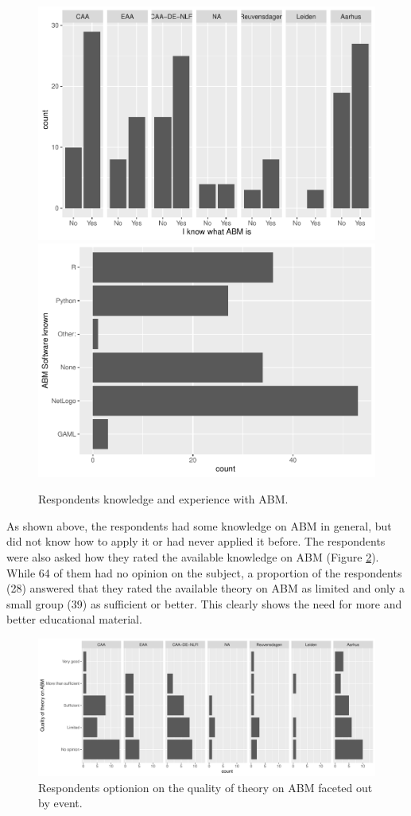 \documentclass[
]{article}
\begin{document}
\begin{figure}
\includegraphics[width=0.5\linewidth]{paper_files/figure-latex/abm-knowledge-1} \includegraphics[width=0.5\linewidth]{paper_files/figure-latex/abm-knowledge-2} \caption{Respondents knowledge and experience with ABM.}\label{fig:abm-knowledge}
\end{figure}

As shown above, the respondents had some knowledge on ABM in general, but did not know how to apply it or had never applied it before. The respondents were also asked how they rated the available knowledge on ABM (Figure \ref{fig:available-theory}). While 64 of them had no opinion on the subject, a proportion of the respondents (28) answered that they rated the available theory on ABM as limited and only a small group (39) as sufficient or better. This clearly shows the need for more and better educational material.

\begin{figure}
\centering
\includegraphics{paper_files/figure-latex/available-theory-1.pdf}
\caption{\label{fig:available-theory}Respondents optionion on the quality of theory on ABM faceted out by event.}
\end{figure}
\end{document}
